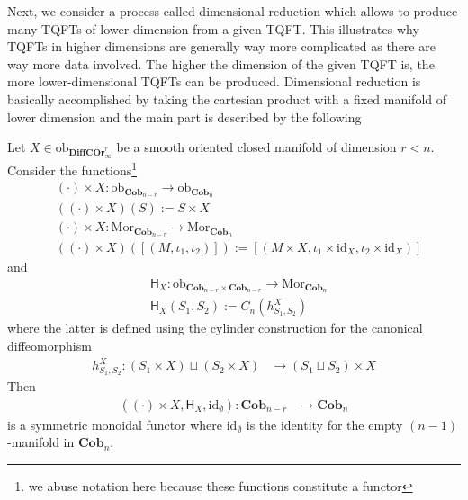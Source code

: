 \nocite{0a816f4c}
Next, we consider a process called dimensional reduction which allows to produce many TQFTs of lower dimension from a given TQFT. This illustrates why TQFTs in higher dimensions are generally way more complicated as there are way more data involved. The higher the dimension of the given TQFT is, the more lower-dimensional TQFTs can be produced. Dimensional reduction is basically accomplished by taking the cartesian product with a fixed manifold of lower dimension and the main part is described by the following
\\
\begin{lem}
\label{lem:cobprod}
Let $X \in \mathrm{ob}_{\mathbf{DiffCOr}_{\infty}^{r}}$ be a smooth oriented closed manifold of dimension $r < n$. Consider the functions\footnote{we abuse notation here because these functions constitute a functor}
\begin{align*}
  &
  (\cdot) \times X
  \colon
  \mathrm{ob}_{\mathbf{Cob}_{n - r}}
  \to
  \mathrm{ob}_{\mathbf{Cob}_{n}}
  \\
  &
  ((\cdot) \times X)(S)
  :=
  S \times X
  \\
  &
  (\cdot) \times X
  \colon
  \mathrm{Mor}_{\mathbf{Cob}_{n - r}}
  \to
  \mathrm{Mor}_{\mathbf{Cob}_{n}}
  \\
  &
  ((\cdot) \times X)([(M,\iota_{1},\iota_{2})])
  :=
  \left[
    \left(
      M \times X
      ,
      \iota_{1}
      \times
      \mathrm{id}_{X}
      ,
      \iota_{2}
      \times
      \mathrm{id}_{X}
    \right)
  \right]
\end{align*}
and
\begin{align*}
  &
  \mathsf{H}_{X}
  \colon
  \mathrm{ob}_{\mathbf{Cob}_{n - r} \times \mathbf{Cob}_{n - r}}
  \to
  \mathrm{Mor}_{\mathbf{Cob}_{n}}
  \\
  &
  \mathsf{H}_{X}(S_{1},S_{2})
  :=
  C_{n}(h_{S_{1},S_{2}}^{X})
\end{align*}
where the latter is defined using the cylinder construction for the canonical diffeomorphism
\begin{align*}
  h_{S_{1},S_{2}}^{X}
  \colon
  (S_{1} \times X)
  \sqcup
  (S_{2} \times X)
  &
  \to
  (S_{1} \sqcup S_{2})
  \times
  X
\end{align*}
Then
\begin{align*}
  \left(
    (\cdot)
    \times
    X
    ,
    \mathsf{H}_{X}
    ,
    \mathrm{id}_{\emptyset}
  \right)
  \colon
  \mathbf{Cob}_{n - r}
  &\to
  \mathbf{Cob}_{n}
\end{align*}
is a symmetric monoidal functor where $\mathrm{id}_{\emptyset}$ is the identity for the empty $(n - 1)$-manifold in $\mathbf{Cob}_{n}$.
\end{lem}
